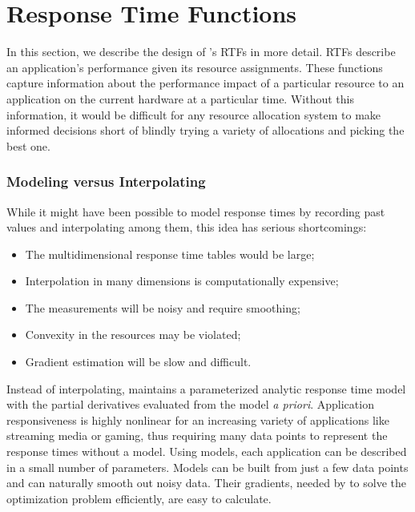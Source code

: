 
\section{Response Time Functions}\label{RTFs}


In this section, we describe the design of \pacora's RTFs in more detail.
RTFs describe an application's performance given its resource assignments.  These functions capture information about the performance impact of a particular resource to an application on the current hardware at a particular time. Without this information, it would be difficult for any resource allocation system to make informed decisions short of blindly trying a variety of allocations and picking the best one.

\subsubsection*{Modeling versus Interpolating} While it might have been possible to model response times by recording past values and interpolating among them, this idea has serious shortcomings:
\begin{itemize}
\item The multidimensional response time tables would be large;
\item Interpolation in many dimensions is computationally expensive;
\item The measurements will be noisy and require smoothing;
\item Convexity in the resources may be violated;
\item Gradient estimation will be slow and difficult.
\end{itemize}

Instead of interpolating, \pacora maintains a parameterized analytic response time model with the partial derivatives evaluated from the model \emph{a priori}. Application responsiveness is highly nonlinear for an increasing variety of applications like streaming media or gaming, thus requiring many data points to represent the response times without a model. Using models, each application can be described in a small number of parameters.  Models can be built from just a few data points and can naturally smooth out noisy data. Their gradients, needed by \pacora to solve the optimization problem efficiently, are easy to calculate.

